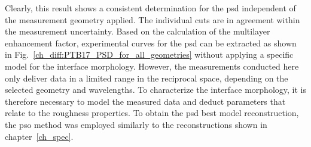 Clearly, this result shows a consistent determination for the \gls{psd} independent of the measurement geometry applied. The individual cuts are in agreement within the measurement uncertainty. Based on the calculation of the multilayer enhancement factor, experimental curves for the \gls{psd} can be extracted as shown in Fig.~\ref{ch_diff:PTB17_PSD_for_all_geometries} without applying a specific model for the interface morphology. However, the measurements conducted here only deliver data in a limited range in the reciprocal space, depending on the selected geometry and wavelengths. To characterize the interface morphology, it is therefore necessary to model the measured data and deduct parameters that relate to the roughness properties. To obtain the \gls{psd} best model reconstruction, the \gls{pso} method was employed similarly to the reconstructions shown in chapter~\ref{ch_spec}.

